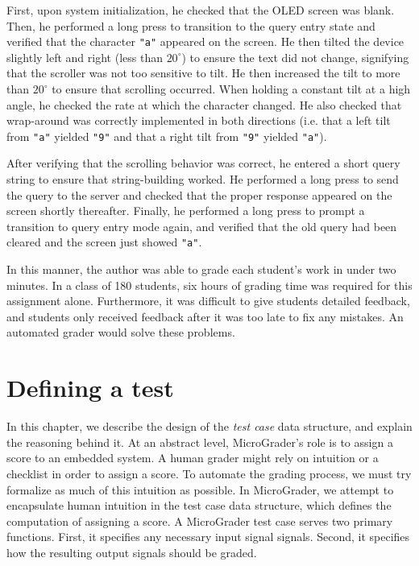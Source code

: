 \documentclass[12pt]{article}
\begin{document}
First, upon system initialization, he checked that the OLED screen was blank.  Then, he performed a long press to transition to the query entry state and verified that the character \texttt{"a"} appeared on the screen.  He then tilted the device slightly left and right (less than $20^{\circ}$) to ensure the text did not change, signifying that the scroller was not too sensitive to tilt.  He then increased the tilt to more than $20^{\circ}$ to ensure that scrolling occurred.  When holding a constant tilt at a high angle, he checked the rate at which the character changed.  He also checked that wrap-around was correctly implemented in both directions (i.e. that a left tilt from \texttt{"a"} yielded \texttt{"9"} and that a right tilt from \texttt{"9"} yielded \texttt{"a"}).

After verifying that the scrolling behavior was correct, he entered a short query string to ensure that string-building worked.  He performed a long press to send the query to the server and checked that the proper response appeared on the screen shortly thereafter.  Finally, he performed a long press to prompt a transition to query entry mode again, and verified that the old query had been cleared and the screen just showed \texttt{"a"}.

In this manner, the author was able to grade each student's work in under two minutes.  In a class of 180 students, six hours of grading time was required for this assignment alone.  Furthermore, it was difficult to give students detailed feedback, and students only received feedback after it was too late to fix any mistakes.  An automated grader would solve these problems.

\clearpage
\section{Defining a test}
In this chapter, we describe the design of the \textit{test case} data structure, and explain the reasoning behind it.  At an abstract level, MicroGrader's role is to assign a score to an embedded system.  A human grader might rely on intuition or a checklist in order to assign a score.   To automate the grading process, we must try formalize as much of this intuition as possible.  In MicroGrader, we attempt to encapsulate human intuition in the test case data structure, which defines the computation of assigning a score.  A MicroGrader test case serves two primary functions.  First, it specifies any necessary input signal signals.  Second, it specifies how the resulting output signals should be graded.
\end{document}
